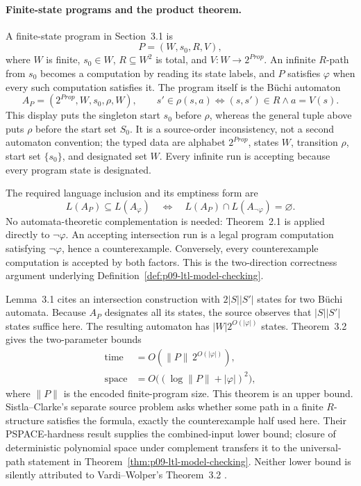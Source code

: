 \paragraph{Finite-state programs and the product theorem.}
A finite-state program in Section~3.1 is
\[
 P=(W,s_0,R,V),
\]
where \(W\) is finite, \(s_0\in W\), \(R\subseteq W^2\) is total, and
\(V:W\to2^{\mathit{Prop}}\).  An infinite \(R\)-path from \(s_0\) becomes a
computation by reading its state labels, and \(P\) satisfies \(\varphi\) when
every such computation satisfies it.  The program itself is the B\"uchi
automaton
\[
 A_P=(2^{\mathit{Prop}},W,s_0,\rho,W),
 \qquad
 s'\in\rho(s,a)
 \Longleftrightarrow
 (s,s')\in R\land a=V(s).
\]
This display puts the singleton start \(s_0\) before \(\rho\), whereas the
general tuple above puts \(\rho\) before the start set \(S_0\).  It is a
source-order inconsistency, not a second automaton convention; the typed data
are alphabet \(2^{\mathit{Prop}}\), states \(W\), transition \(\rho\), start
set \(\{s_0\}\), and designated set \(W\).
Every infinite run is accepting because every program state is designated.

The required language inclusion and its emptiness form are
\[
 L(A_P)\subseteq L(A_\varphi)
 \quad\Longleftrightarrow\quad
 L(A_P)\cap L(A_{\neg\varphi})=\varnothing.
\]
No automata-theoretic complementation is needed: Theorem~2.1 is applied
directly to \(\neg\varphi\).  An accepting intersection run is a legal
program computation satisfying \(\neg\varphi\), hence a counterexample.
Conversely, every counterexample computation is accepted by both factors.
This is the two-direction correctness argument underlying
Definition~\ref{def:p09-ltl-model-checking}.

Lemma~3.1 cites an intersection construction with \(2|S||S'|\) states for
two B\"uchi automata.  Because \(A_P\) designates all its states, the source
observes that \(|S||S'|\) states suffice here.  The resulting automaton has
\(|W|2^{O(|\varphi|)}\) states.  Theorem~3.2 gives the two-parameter bounds
\[
\begin{aligned}
 \text{time}&=O(\lVert P\rVert\,2^{O(|\varphi|)}),\\
 \text{space}&=O\bigl((\log\lVert P\rVert+|\varphi|)^2\bigr),
\end{aligned}
\]
where \(\lVert P\rVert\) is the encoded finite-program size.  This theorem is
an upper bound.  Sistla--Clarke's separate source problem asks whether some
path in a finite \(R\)-structure satisfies the formula, exactly the
counterexample half used here.  Their PSPACE-hardness result supplies the
combined-input lower bound; closure of deterministic polynomial space under
complement transfers it to the universal-path statement in
Theorem~\ref{thm:p09-ltl-model-checking}.  Neither lower bound is silently
attributed to Vardi--Wolper's Theorem~3.2
\cite[preprint p.~5]{VardiWolper1986}.

